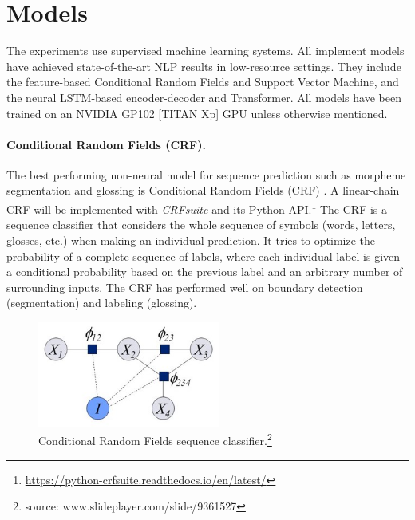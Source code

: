 \section{Models}
\label{sec:models}

The experiments use supervised machine learning systems. All implement models have achieved state-of-the-art NLP results in low-resource settings. They include the feature-based Conditional Random Fields and Support Vector Machine, and the neural LSTM-based encoder-decoder and Transformer. All models have been trained on an NVIDIA GP102 [TITAN Xp] GPU unless otherwise mentioned.

\paragraph{Conditional Random Fields (CRF).} The best performing non-neural model for sequence prediction such as morpheme segmentation and glossing is Conditional Random Fields (CRF) \citep{lafferty_conditional_2001,muller_efficient_2013,ruokolainen_comparative_2016}. A linear-chain CRF \citep{lafferty_conditional_2001} will be implemented with \textit{CRFsuite} \citep{okazaki2007} and its Python API.\footnote{\url{https://python-crfsuite.readthedocs.io/en/latest/}} 
The CRF is a sequence classifier that considers the whole sequence of symbols (words, letters, glosses, etc.) when making an individual prediction. It tries to optimize the probability of a complete sequence of labels, where each individual label is given a conditional probability based on the previous label and an arbitrary number of surrounding inputs. %
The CRF has performed well on boundary detection (segmentation) and labeling (glossing). 


\begin{figure}
    \centering
    \includegraphics[width=6cm]{figs/CRF.jpg}
    \caption[Conditional Random Fields]{Conditional Random Fields sequence classifier.\footnote{source: www.slideplayer.com/slide/9361527}}
    \label{fig:CRF}
\end{figure}


